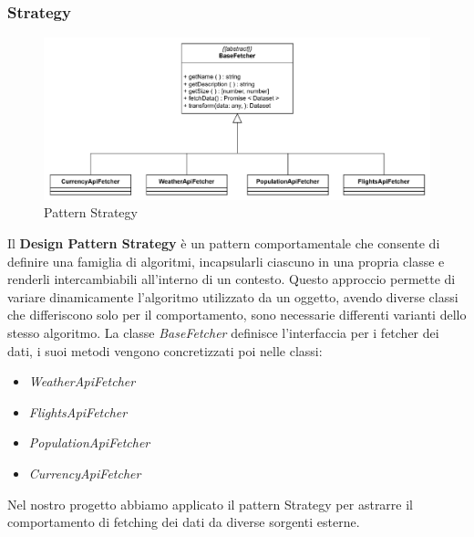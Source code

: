 \subsubsection{Strategy}
\begin{figure}[h!] \centering       
    \includegraphics[scale = 0.55]{template/images/uml_back/Strategy.png}
    \caption{Pattern Strategy}
\end{figure}
Il \textbf{Design Pattern Strategy} è un pattern comportamentale che consente di definire una famiglia di algoritmi, incapsularli ciascuno in una propria classe e renderli intercambiabili all'interno di un contesto.
Questo approccio permette di variare dinamicamente l'algoritmo utilizzato da un oggetto, avendo diverse classi che differiscono solo per il comportamento, sono necessarie differenti varianti dello stesso algoritmo.
La classe \textit{BaseFetcher} definisce l'interfaccia per i fetcher dei dati, i suoi metodi vengono concretizzati poi nelle classi:
\begin{itemize}
    \item \textit{WeatherApiFetcher}
    \item \textit{FlightsApiFetcher}
    \item \textit{PopulationApiFetcher}
    \item \textit{CurrencyApiFetcher}
\end{itemize}
Nel nostro progetto abbiamo applicato il pattern Strategy per astrarre il comportamento di fetching dei dati da diverse sorgenti esterne.

